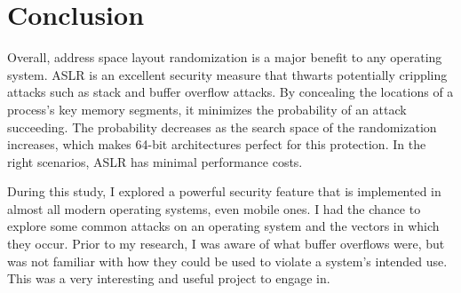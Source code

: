 \section{Conclusion}
\label{s:conclusion} %

Overall, address space layout randomization is a major benefit to any operating system. ASLR is an excellent security measure that thwarts potentially crippling attacks such as stack and buffer overflow attacks. By concealing the locations of a process’s key memory segments, it minimizes the probability of an attack succeeding. The probability decreases as the search space of the randomization increases, which makes 64-bit architectures perfect for this protection. In the right scenarios, ASLR has minimal performance costs.

During this study, I explored a powerful security feature that is implemented in almost all modern operating systems, even mobile ones. I had the chance to explore some common attacks on an operating system and the vectors in which they occur. Prior to my research, I was aware of what buffer overflows were, but was not familiar with how they could be used to violate a system’s intended use. This was a very interesting and useful project to engage in.
